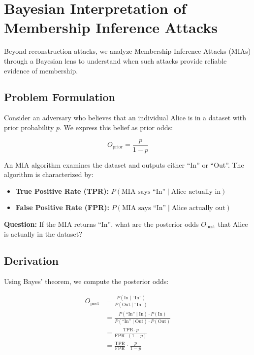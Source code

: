 \documentclass[11pt,letterpaper]{article}
\begin{document}
\section{Bayesian Interpretation of Membership Inference Attacks}

Beyond reconstruction attacks, we analyze Membership Inference Attacks (MIAs) through a Bayesian lens to understand when such attacks provide reliable evidence of membership.

\subsection{Problem Formulation}

Consider an adversary who believes that an individual Alice is in a dataset with prior probability $p$. We express this belief as prior odds:

\begin{equation}
    O_{\text{prior}} = \frac{p}{1-p}
\end{equation}

An MIA algorithm examines the dataset and outputs either ``In'' or ``Out''. The algorithm is characterized by:

\begin{itemize}[leftmargin=*]
    \item \textbf{True Positive Rate (TPR):} $P(\text{MIA says ``In''} \mid \text{Alice actually in})$
    \item \textbf{False Positive Rate (FPR):} $P(\text{MIA says ``In''} \mid \text{Alice actually out})$
\end{itemize}

\textbf{Question:} If the MIA returns ``In'', what are the posterior odds $O_{\text{post}}$ that Alice is actually in the dataset?

\subsection{Derivation}

Using Bayes' theorem, we compute the posterior odds:

\begin{align}
    O_{\text{post}} &= \frac{P(\text{In} \mid \text{``In''})}{P(\text{Out} \mid \text{``In''})} \\
    &= \frac{P(\text{``In''} \mid \text{In}) \cdot P(\text{In})}{P(\text{``In''} \mid \text{Out}) \cdot P(\text{Out})} \\
    &= \frac{\text{TPR} \cdot p}{\text{FPR} \cdot (1-p)} \\
    &= \frac{\text{TPR}}{\text{FPR}} \cdot \frac{p}{1-p}
\end{align}
\end{document}
